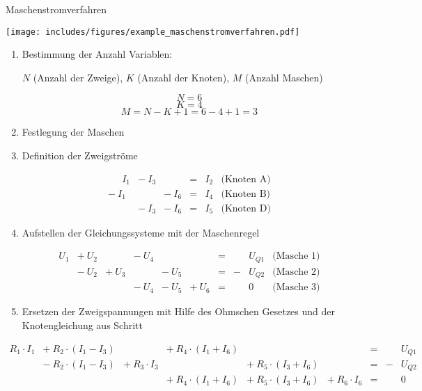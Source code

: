 \begin{example}{Maschenstromverfahren}
    \begin{center}
        \texttt{[image: includes/figures/example\_maschenstromverfahren.pdf]}
    \end{center}

    \begin{enumerate}
        \item Bestimmung der Anzahl Variablen:

              $N$ (Anzahl der Zweige), $K$ (Anzahl der Knoten), $M$ (Anzahl Maschen)

              \[
                  N = 6
              \]
              \[
                  K = 4
              \]
              \[
                  M = N - K + 1 = 6 - 4 + 1 = 3
              \]
        \item Festlegung der Maschen
        \item Definition der Zweigströme

              \[
                  \begin{matrix}
                      \phantom{-} \ I_1 & - \ I_3 &         & = & I_2 & \text{(Knoten A)} \\
                      - \ I_1           &         & - \ I_6 & = & I_4 & \text{(Knoten B)} \\
                                        & - \ I_3 & - \ I_6 & = & I_5 & \text{(Knoten D)}
                  \end{matrix}
              \]
        \item Aufstellen der Gleichungssysteme mit der Maschenregel

              \[
                  \begin{matrix}
                      U_1 & + \ U_2 &         & - \ U_4 &         &         & = &   & U_{Q1} & \text{(Masche 1)} \\
                          & - \ U_2 & + \ U_3 &         & - \ U_5 &         & = & - & U_{Q2} & \text{(Masche 2)} \\
                          &         &         & - \ U_4 & - \ U_5 & + \ U_6 & = &   & 0      & \text{(Masche 3)}
                  \end{matrix}
              \]
        \item Ersetzen der Zweigspannungen mit Hilfe des Ohmschen Gesetzes und der Knotengleichung aus Schritt
    \end{enumerate}

    \[
        \begin{matrix}
            R_1 \cdot I_1 & + \ R_2 \cdot (I_1 - I_3) &                   & + \ R_4 \cdot (I_1 + I_6) &                           &                   & = &   & U_{Q1} \\
                          & - \ R_2 \cdot (I_1 - I_3) & + \ R_3 \cdot I_3 &                           & + \ R_5 \cdot (I_3 + I_6) &                   & = & - & U_{Q2} \\
                          &                           &                   & + \ R_4 \cdot (I_1 + I_6) & + \ R_5 \cdot (I_3 + I_6) & + \ R_6 \cdot I_6 & = &   & 0
        \end{matrix}
    \]
\end{example}
